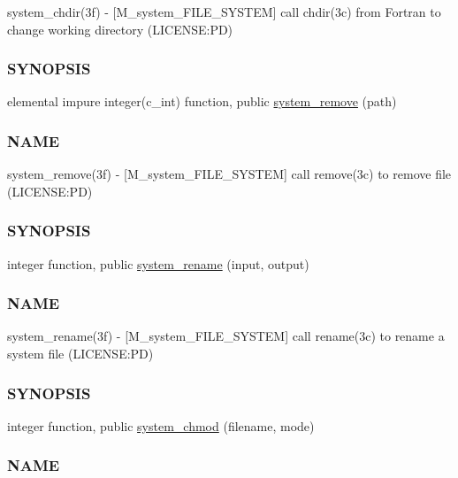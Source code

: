 \begin{DoxyCompactItemize}
\begin{DoxyCompactList}
system\+\_\+chdir(3f) -\/ \mbox{[}M\+\_\+system\+\_\+\+F\+I\+L\+E\+\_\+\+S\+Y\+S\+T\+EM\mbox{]} call chdir(3c) from Fortran to change working directory (L\+I\+C\+E\+N\+SE\+:PD) \subsubsection*{S\+Y\+N\+O\+P\+S\+IS}\end{DoxyCompactList}\item 
elemental impure integer(c\+\_\+int) function, public \mbox{\hyperlink{namespacem__system_a7fa10b991ae066609b687423918cff52}{system\+\_\+remove}} (path)
\begin{DoxyCompactList}\small\item\em \subsubsection*{N\+A\+ME}

system\+\_\+remove(3f) -\/ \mbox{[}M\+\_\+system\+\_\+\+F\+I\+L\+E\+\_\+\+S\+Y\+S\+T\+EM\mbox{]} call remove(3c) to remove file (L\+I\+C\+E\+N\+SE\+:PD) \subsubsection*{S\+Y\+N\+O\+P\+S\+IS}\end{DoxyCompactList}\item 
integer function, public \mbox{\hyperlink{namespacem__system_adfbaf3d17790da9ba0c520683d5b8003}{system\+\_\+rename}} (input, output)
\begin{DoxyCompactList}\small\item\em \subsubsection*{N\+A\+ME}

system\+\_\+rename(3f) -\/ \mbox{[}M\+\_\+system\+\_\+\+F\+I\+L\+E\+\_\+\+S\+Y\+S\+T\+EM\mbox{]} call rename(3c) to rename a system file (L\+I\+C\+E\+N\+SE\+:PD) \subsubsection*{S\+Y\+N\+O\+P\+S\+IS}\end{DoxyCompactList}\item 
integer function, public \mbox{\hyperlink{namespacem__system_ace9ce0c8a9c8341a76b8903cd2390ce3}{system\+\_\+chmod}} (filename, mode)
\begin{DoxyCompactList}\small\item\em \subsubsection*{N\+A\+ME}


\end{DoxyCompactList}
\end{DoxyCompactItemize}
